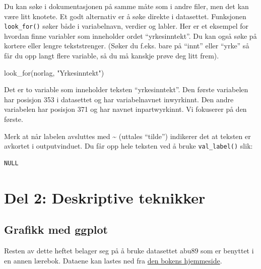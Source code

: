 \documentclass[
  letterpaper,
  DIV=11,
  numbers=noendperiod]{scrreprt}
\newenvironment{Shaded}{\begin{snugshade}}{\end{snugshade}}
\newcommand{\FunctionTok}[1]{\textcolor[rgb]{0.28,0.35,0.67}{#1}}
\newcommand{\NormalTok}[1]{\textcolor[rgb]{0.00,0.23,0.31}{#1}}
\newcommand{\SpecialCharTok}[1]{\textcolor[rgb]{0.37,0.37,0.37}{#1}}
\newcommand{\StringTok}[1]{\textcolor[rgb]{0.13,0.47,0.30}{#1}}
\theoremstyle{definition}
\theoremstyle{remark}
\begin{document}
Du kan søke i dokumentasjonen på samme måte som i andre filer, men det
kan være litt knotete. Et godt alternativ er å søke direkte i
datasettet. Funksjonen \texttt{look\_for()} søker både i variabelnavn,
verdier og labler. Her er et eksempel for hvordan finne variabler som
inneholder ordet ``yrkesinntekt''. Du kan også søke på kortere eller
lengre tekststrenger. (Søker du f.eks. bare på ``innt'' eller ``yrke''
så får du opp langt flere variable, så du må kanskje prøve deg litt
frem).

\begin{Shaded}
\begin{Highlighting}[]
\FunctionTok{look\_for}\NormalTok{(norlag, }\StringTok{"Yrkesinntekt"}\NormalTok{)}
\end{Highlighting}
\end{Shaded}

Det er to variable som inneholder teksten ``yrkesinntekt''. Den første
variabelen har posisjon 353 i datasettet og har variabelnavnet
inwyrkinnt. Den andre variabelen har posisjon 371 og har navnet
inpartwyrkinnt. Vi fokuserer på den første.

Merk at når labelen avsluttes med \textasciitilde{} (uttales ``tilde'')
indikerer det at teksten er avkortet i outputvinduet. Du får opp hele
teksten ved å bruke \texttt{val\_label()} slik:

\begin{Shaded}
\end{Shaded}

\begin{verbatim}
NULL
\end{verbatim}

\part{Del 2: Deskriptive teknikker}

\hypertarget{grafikk-med-ggplot}{%
\chapter{Grafikk med ggplot}\label{grafikk-med-ggplot}}

Resten av dette heftet belager seg på å bruke datasettet abu89 som er
benyttet i en annen lærebok. Dataene kan lastes ned fra
\href{https://stata.fagbokforlaget.no/}{den bokens hjemmeside}.
\end{document}
